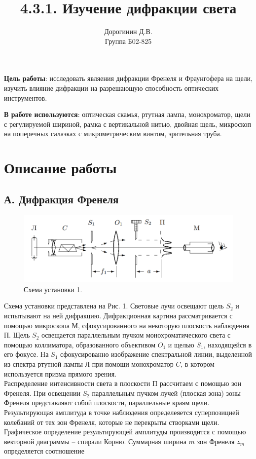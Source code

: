 \documentclass[a4paper,12pt]{article}
\author{Дорогинин Д.В.\\
Группа Б02-825}
\title{4.3.1. Изучение дифракции света}
\date{}
\begin{document}
\maketitle
\textbf{Цель работы}: исследовать являения дифракции Френеля и Фраунгофера на щели, изучить влияние дифракции на разрешающую способность оптических инструментов.


\textbf{В работе используются}: оптическая скамья, ртутная лампа, монохроматор, щели с регулируемой шириной, рамка с вертикальной нитью, двойная щель, микроскоп на поперечных салазках с микрометрическим винтом, зрительная труба.
\section*{Описание работы}
\subsection*{А. Дифракция Френеля}
\begin{figure}[h]
\includegraphics[scale=0.7]{0.png}
\centering
\caption{Схема установки 1.}
\end{figure}
Схема установки представлена на Рис. 1. Световые лучи освещают щель $S_2$ и испытывают на ней дифракцию. Дифракционная картина рассматривается с помощью микроскопа М, сфокусированного на некоторую плоскость наблюдения П. Щель $S_2$ освещается параллельным пучком монохроматического света с помощью коллиматора, образованного объективом $O_1$ и щелью $S_1$, находящейся в его фокусе. На $S_1$ сфокусированно изображение спектральной линии, выделенной из спектра ртутной лампы Л при помощи монохроматор $C$, в котором используется призма прямого зрения. \\
Распределение интенсивности света в плоскости П рассчитаем с помощью зон Френеля. При освещении $S_2$ параллельным пучком лучей (плоская зона) зоны Френеля представляют собой плоскости, параллельные краям щели. Результирующая амплитуда в точке наблюдения определеяется суперпозицией колебаний от тех зон Френеля, которые не перекрыты створками щели. Графическое определение результирующей амплитуды производится с помощью векторной диаграммы -- спирали Корню. Суммарная ширина $m$ зон Френеля $z_m$ определяется соотношение
\end{document}
